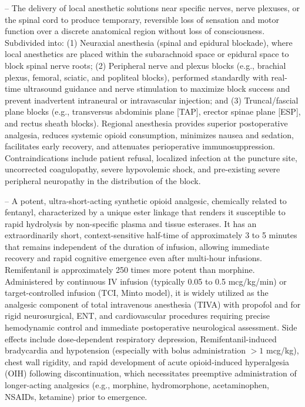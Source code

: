 -- The delivery of local anesthetic solutions near specific nerves, nerve plexuses, or the spinal cord to produce temporary, reversible loss of sensation and motor function over a discrete anatomical region without loss of consciousness. Subdivided into: (1) Neuraxial anesthesia (spinal and epidural blockade), where local anesthetics are placed within the subarachnoid space or epidural space to block spinal nerve roots; (2) Peripheral nerve and plexus blocks (e.g., brachial plexus, femoral, sciatic, and popliteal blocks), performed standardly with real-time ultrasound guidance and nerve stimulation to maximize block success and prevent inadvertent intraneural or intravascular injection; and (3) Truncal/fascial plane blocks (e.g., transversus abdominis plane [TAP], erector spinae plane [ESP], and rectus sheath blocks). Regional anesthesia provides superior postoperative analgesia, reduces systemic opioid consumption, minimizes nausea and sedation, facilitates early recovery, and attenuates perioperative immunosuppression. Contraindications include patient refusal, localized infection at the puncture site, uncorrected coagulopathy, severe hypovolemic shock, and pre-existing severe peripheral neuropathy in the distribution of the block.

-- A potent, ultra-short-acting synthetic opioid analgesic, chemically related to fentanyl, characterized by a unique ester linkage that renders it susceptible to rapid hydrolysis by non-specific plasma and tissue esterases. It has an extraordinarily short, context-sensitive half-time of approximately 3 to 5 minutes that remains independent of the duration of infusion, allowing immediate recovery and rapid cognitive emergence even after multi-hour infusions. Remifentanil is approximately 250 times more potent than morphine. Administered by continuous IV infusion (typically 0.05 to 0.5 mcg/kg/min) or target-controlled infusion (TCI, Minto model), it is widely utilized as the analgesic component of total intravenous anesthesia (TIVA) with propofol and for rigid neurosurgical, ENT, and cardiovascular procedures requiring precise hemodynamic control and immediate postoperative neurological assessment. Side effects include dose-dependent respiratory depression, Remifentanil-induced bradycardia and hypotension (especially with bolus administration $>1$ mcg/kg), chest wall rigidity, and rapid development of acute opioid-induced hyperalgesia (OIH) following discontinuation, which necessitates preemptive administration of longer-acting analgesics (e.g., morphine, hydromorphone, acetaminophen, NSAIDs, ketamine) prior to emergence.

